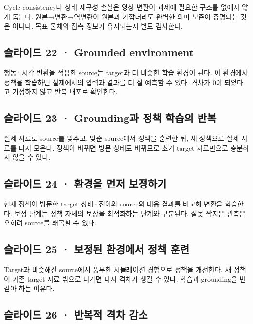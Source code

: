 \documentclass[11pt,a4paper]{article}
\begin{document}
Cycle consistency나 상태 재구성 손실은 영상 변환이 과제에 필요한 구조를 없애지 않게 돕는다. 원본→변환→역변환이 원본과 가깝더라도 완벽한 의미 보존이 증명되는 것은 아니다. 목표 물체와 접촉 정보가 유지되는지 별도 검사한다.\par

\subsection{슬라이드 22 · Grounded environment}

행동·시각 변환을 적용한 source는 target과 더 비슷한 학습 환경이 된다. 이 환경에서 정책을 학습하면 실제에서의 입력과 결과를 더 잘 예측할 수 있다. 격차가 0이 되었다고 가정하지 않고 반복 배포로 확인한다.\par

\subsection{슬라이드 23 · Grounding과 정책 학습의 반복}

실제 자료로 source를 맞추고, 맞춘 source에서 정책을 훈련한 뒤, 새 정책으로 실제 자료를 다시 모은다. 정책이 바뀌면 방문 상태도 바뀌므로 초기 target 자료만으로 충분하지 않을 수 있다.\par

\subsection{슬라이드 24 · 환경을 먼저 보정하기}

현재 정책이 방문한 target 상태·전이와 source의 대응 결과를 비교해 변환을 학습한다. 보정 단계는 정책 자체의 보상을 최적화하는 단계와 구분된다. 잘못 짝지은 관측은 오히려 source를 왜곡할 수 있다.\par

\subsection{슬라이드 25 · 보정된 환경에서 정책 훈련}

Target과 비슷해진 source에서 풍부한 시뮬레이션 경험으로 정책을 개선한다. 새 정책이 기존 target 자료 밖으로 나가면 다시 격차가 생길 수 있다. 학습과 grounding을 번갈아 하는 이유다.\par

\subsection{슬라이드 26 · 반복적 격차 감소}
\end{document}
